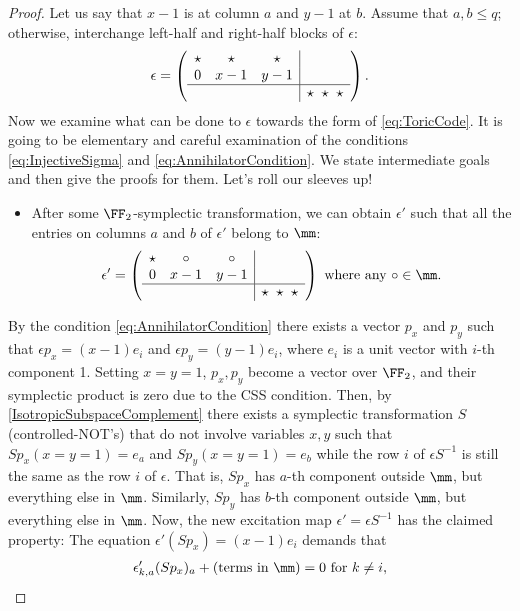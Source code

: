 \begin{proof}
Let us say that $x-1$ is at column $a$ and $y-1$ at $b$.
Assume that $a,b \le q$;
otherwise, interchange left-half and right-half blocks of $\epsilon$:
\begin{align}
\epsilon = \left(\begin{array}{ccc|c}
\star & \star  & \star &\\
0 & x-1  & y-1  &\\
\hline
&&& \star~\star~\star
\end{array}\right).
\end{align}
Now we examine what can be done to $\epsilon$
towards the form of \eqref{eq:ToricCode}.
It is going to be elementary and careful
examination of the conditions \eqref{eq:InjectiveSigma} and \eqref{eq:AnnihilatorCondition}.
We state intermediate goals and then give the proofs for them.
Let's roll our sleeves up!
\begin{itemize}
\item[(I)] After some $\FF_2$-symplectic transformation,
 we can obtain $\epsilon'$ such that
 all the entries on columns $a$ and $b$ of $\epsilon'$ belong to $\mm$:
 \begin{align}
\epsilon' = \left(\begin{array}{ccc|c}
\star & \circ  & \circ &\\
0 & x-1  & y-1 &\\
\hline
&&& \star~\star~\star
\end{array}\right) \text{ where any } \circ \in \mm.
\end{align}
\end{itemize}
By the condition \eqref{eq:AnnihilatorCondition}
there exists a vector $p_x$ and $p_y$
such that $\epsilon p_x = (x-1)e_i$ and $\epsilon p_y = (y-1) e_i$,
where $e_i$ is a unit vector with $i$-th component 1.
Setting $x=y=1$, $p_x, p_y$ become a vector over $\FF_2$,
and their symplectic product is zero due to the CSS condition.
Then, by \ref{IsotropicSubspaceComplement} 
there exists a symplectic transformation $S$ (controlled-NOT's) 
that do not involve variables $x,y$
such that $S p_x(x=y=1) = e_a$ and $S p_y(x=y=1) = e_b$ 
while the row $i $ of $\epsilon S^{-1}$ is still the same as the row $i$ of $\epsilon$.
That is, $S p_x$ has $a$-th component outside $\mm$, 
but everything else in $\mm$.
Similarly, $S p_y$ has $b$-th component outside $\mm$, 
but everything else in $\mm$.
Now, the new excitation map $\epsilon' = \epsilon S^{-1}$ has the claimed property:
The equation $\epsilon' (Sp_x) = (x-1)e_i$ demands that
\begin{align}
 \epsilon'_{k,a} (Sp_x)_{a} + (\text{terms in }\mm) = 0 \text{ for } k \neq i,

\end{align}
\end{proof}

